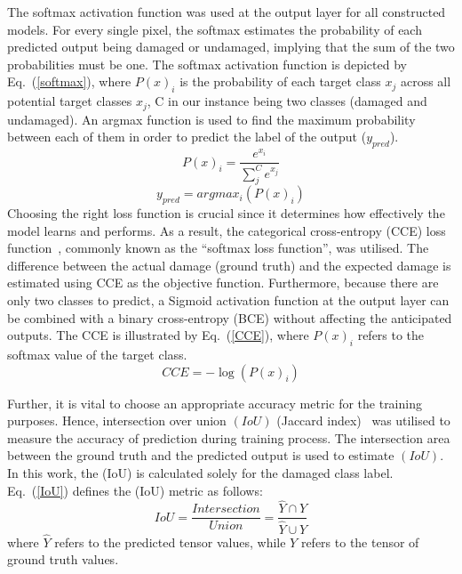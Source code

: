 The softmax activation function was used at the output layer for all constructed models.
For every single pixel, the softmax estimates the probability of each predicted output being damaged or undamaged, implying that the sum of the two probabilities must be one.
The softmax activation function is depicted by Eq.~(\ref{softmax}), where \(P(x)_{i}\) is the probability of each target class \(x_{j}\) across all potential target classes \(x_{j}\), C in our instance being two classes (damaged and undamaged).
An argmax function is used to find the maximum probability between each of them in order to predict the label of the output (\(y_{pred}\)).
\begin{equation}
	P(x)_{i} = \frac{e^{x_{i}}}{\sum_{j}^{C} e^{x_{j}}}
	\label{softmax}
\end{equation} 
\begin{equation}
	y_{pred} = argmax_{i}\left( P(x)_{i} \right)
	\label{argmax}
\end{equation}
Choosing the right loss function is crucial since it determines how effectively the model learns and performs.
As a result, the categorical cross-entropy (CCE) loss function~\cite{Bonaccorso2020}, commonly known as the \enquote{softmax loss function}, was utilised.
The difference between the actual damage (ground truth) and the expected damage is estimated using CCE as the objective function.
Furthermore, because there are only two classes to predict, a Sigmoid activation function at the output layer can be combined with a binary cross-entropy (BCE) without affecting the anticipated outputs.
The CCE is illustrated by Eq.~(\ref{CCE}), where  \( P(x)_{i}\) refers to the softmax value of the target class.
\begin{equation}	
	CCE = -\log\left( P(x)_{i} \right)
	\label{CCE}
\end{equation}

Further, it is vital to choose an appropriate accuracy metric for the training purposes.
Hence, intersection over union \((IoU)\) (Jaccard index)~\cite{Bertels2019} was utilised to measure the accuracy of prediction during training process.
The intersection area between the ground truth and the predicted output is used to estimate \((IoU)\).
In this work, the (IoU) is calculated solely for the damaged class label.
Eq.~(\ref{IoU}) defines the (IoU) metric as follows:
\begin{equation}
	IoU = \frac{Intersection}{Union} = \frac{\hat{Y} \cap Y}{\hat{Y} \cup Y} 
	\label{IoU}
\end{equation}
where \(\hat{Y}\) refers to the predicted tensor values, while \(Y\) refers to the tensor of ground truth values.

